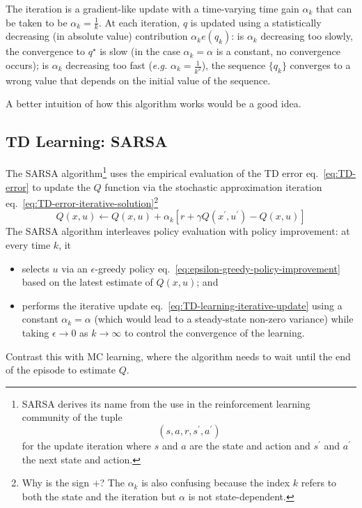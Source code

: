 The iteration is a gradient-like update with a time-varying time gain $\alpha_k$ that can be taken to be $\alpha_k = \frac{1}{k}$. At each iteration, $q$ is updated using a statistically decreasing (in absolute value) contribution $\alpha_k e(q_k)$: is $\alpha_k$ decreasing too slowly, the convergence to $q^\star$ is slow (in the case $\alpha_k=\alpha$ is a constant, no convergence occurs); is $\alpha_k$ decreasing too fast (\textit{e.g.} $\alpha_k=\tfrac{1}{k^2}$), the sequence $\{q_k\}$ converges to a wrong value that depends on the initial value of the sequence.

A better intuition of how this algorithm works would be a good idea.


\subsection{TD Learning: SARSA}
\label{sec:TD-learning-sarsa}

The SARSA algorithm\footnote{SARSA derives its name from the use in the reinforcement learning community of the tuple
  \begin{equation*}
    (s,a,r,s^\prime,a^\prime)
  \end{equation*}
  for the update iteration where $s$ and $a$ are the state and action and $s^\prime$ and $a^\prime$ the next state and action.} uses the empirical evaluation of the TD error eq.~\eqref{eq:TD-error} to update the $Q$ function via the stochastic approximation iteration eq.~\eqref{eq:TD-error-iterative-solution}\footnote{Why is the sign $+$? The $\alpha_k$ is also confusing because the index $k$ refers to both the state and the iteration but $\alpha$ is not state-dependent.}
\begin{equation}
  \label{eq:TD-learning-iterative-update}
  Q(x,u) \leftarrow Q(x,u) + \alpha_k\left[r + \gamma Q(x^\prime,u^\prime) - Q(x,u)\right]
\end{equation}
The SARSA algorithm interleaves policy evaluation with policy improvement: at every time $k$, it
\begin{itemize}
\item selects $u$ via an $\epsilon$-greedy policy eq.~\eqref{eq:epsilon-greedy-policy-improvement} based on the latest estimate of $Q(x,u)$; and
\item performs the iterative update eq.~\eqref{eq:TD-learning-iterative-update} using a constant $\alpha_k = \alpha$ (which would lead to a steady-state non-zero variance) while taking $\epsilon\rightarrow 0$ as $k\rightarrow \infty$ to control the convergence of the learning.
\end{itemize}
Contrast this with MC learning, where the algorithm needs to wait until the end of the episode to estimate $Q$.


